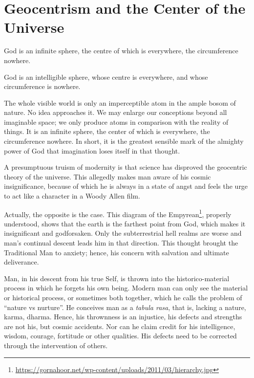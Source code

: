 \section{Geocentrism and the Center of the Universe}

\begin{quotex}
God is an infinite sphere, the centre of which is everywhere, the circumference nowhere.

God is an intelligible sphere, whose centre is everywhere, and whose circumference is nowhere.

The whole visible world is only an imperceptible atom in the ample bosom of nature. No idea approaches it. We may enlarge our conceptions beyond all imaginable space; we only produce atoms in comparison with the reality of things. It is an infinite sphere, the center of which is everywhere, the circumference nowhere. In short, it is the greatest sensible mark of the almighty power of God that imagination loses itself in that thought.
\end{quotex}


A presumptuous truism of modernity is that science has disproved the geocentric theory of the universe. This allegedly makes man aware of his cosmic insignificance, because of which he is always in a state of angst and feels the urge to act like a character in a Woody Allen film.

Actually, the opposite is the case. This diagram of the Empyrean\footnote{\url{https://gornahoor.net/wp-content/uploads/2011/03/hierarchy.jpg}}, properly understood, shows that the earth is the farthest point from God, which makes it insignificant and godforsaken. Only the subterrestrial hell realms are worse and man's continual descent leads him in that direction. This thought brought the Traditional Man to anxiety; hence, his concern with salvation and ultimate deliverance.

Man, in his descent from his true Self, is thrown into the historico-material process in which he forgets his own being. Modern man can only see the material or historical process, or sometimes both together, which he calls the problem of ``nature vs nurture''. He conceives man as a \emph{tabula rasa}, that is, lacking a nature, karma, dharma. Hence, his thrownness is an injustice, his defects and strengths are not his, but cosmic accidents. Nor can he claim credit for his intelligence, wisdom, courage, fortitude or other qualities. His defects need to be corrected through the intervention of others.

